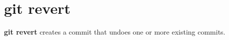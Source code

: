 %

\section{git revert}
\textbf{git revert} creates a commit that undoes one or more existing commits.

%